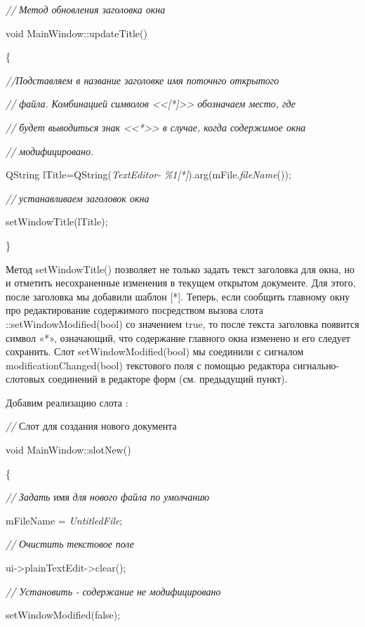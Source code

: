 \textit{//} \textit{Метод обновления заголовка окна}\textit{ }

void MainWindow::updateTitle()

\{

\textit{//}\textit{Подставляем в название заголовке имя поточнго открытого}

\textit{// файла.}\textit{ }\textit{Комбинацией символов <<[*]>> обозначаем место, где}

\textit{// будет выводиться}\textit{ }\textit{з}\textit{нак <<*>> в случае, когда содержимое окна}

{\itshape
// модифицировано.}

QString lTitle=QString(\textit{TextEditor-} \textit{\%1[*]}).arg(mFile.\textit{fileName}());

\textit{//} \textit{устанавливаем заголовок окна}\textit{ }

setWindowTitle(lTitle);

\}

Метод setWindowTitle() позволяет не только задать текст заголовка для окна, но и отметить несохраненные изменения в
текущем открытом документе. Для этого, после заголовка мы добавили шаблон [*]. Теперь, если сообщить главному окну про
редактирование содержимого посредством вызова слота ::setWindowModified(bool) со значением true, то после текста
заголовка появится символ «*», означающий, что содержание главного окна изменено и его следует сохранить. Слот
setWindowModified(bool) мы соединили с сигналом modificationChanged(bool) текстового поля  с помощью
редактора сигнально{}-слотовых соединений в редакторе форм (см. предыдущий пункт). 

Добавим реализацию слота  :

\textit{// }Слот для создания нового документа 

void MainWindow::slotNew()

\{

\textit{ //} \textit{Задать} имя \textit{для} \textit{нового} \textit{файла по умолчанию}

 mFileName = \textit{UntitledFile};

 \textit{//} \textit{Очистить} \textit{текстовое} \textit{поле}

 ui-{>}plainTextEdit-{>}clear();

 \textit{// Установить} \textit{{}-} \textit{содержание} \textit{не} \textit{модифицировано}

 setWindowModified(false);

